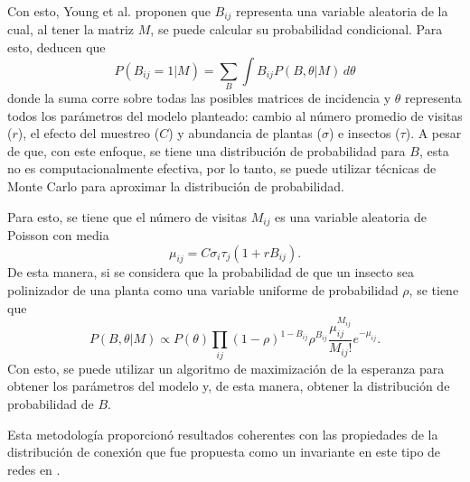 Con esto, Young et al. \cite{young-2021} proponen que $B_{ij}$ representa una variable aleatoria de la cual, al tener la matriz $M$, se puede calcular su probabilidad condicional. Para esto, deducen que
\[
    P(B_{ij}=1|M) = \sum_{B} \int B_{ij} P(B, \theta|M)\, d\theta
\]
donde la suma corre sobre todas las posibles matrices de incidencia y $\theta$ representa todos los parámetros del modelo planteado: cambio al número promedio de visitas ($r$), el efecto del muestreo ($C$) y abundancia de plantas ($\sigma$) e insectos ($\tau$). A pesar de que, con este enfoque, se tiene una distribución de probabilidad para $B$, esta no es computacionalmente efectiva, por lo tanto, se puede utilizar técnicas de Monte Carlo para aproximar la distribución de probabilidad.

Para esto, se tiene que el número de visitas $M_{ij}$ es una variable aleatoria de Poisson con media
\[
    \mu_{ij} = C \sigma_i \tau_j (1 + rB_{ij}).
\]
De esta manera, si se considera que la probabilidad de que un insecto sea polinizador de una planta como una variable uniforme de probabilidad $\rho$, se tiene que
\[
    P(B, \theta|M) \propto P(\theta) \prod_{ij} (1-\rho)^{1-B_{ij}} \rho^{B_{ij}}  \frac{\mu_{ij}^{M_{ij}} }{M_{ij}!}e^{-\mu_{ij}} .
\]
Con esto, se puede utilizar un algoritmo de maximización de la esperanza para obtener los parámetros del modelo y, de esta manera, obtener la distribución de probabilidad de $B$.


Esta metodología proporcionó resultados coherentes con las propiedades de la distribución de conexión que fue propuesta como un invariante en este tipo de redes en \cite{jordano-2002}.